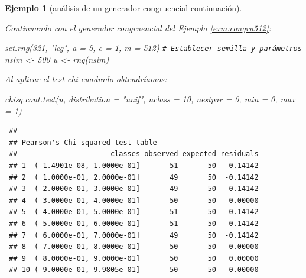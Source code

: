 \documentclass[
  10pt,
]{book}
\newenvironment{Shaded}{\begin{snugshade}}{\end{snugshade}}
\newcommand{\AttributeTok}[1]{\textcolor[rgb]{0.77,0.63,0.00}{#1}}
\newcommand{\CommentTok}[1]{\textcolor[rgb]{0.56,0.35,0.01}{\textit{#1}}}
\newcommand{\DecValTok}[1]{\textcolor[rgb]{0.00,0.00,0.81}{#1}}
\newcommand{\FunctionTok}[1]{\textcolor[rgb]{0.00,0.00,0.00}{#1}}
\newcommand{\NormalTok}[1]{#1}
\newcommand{\OtherTok}[1]{\textcolor[rgb]{0.56,0.35,0.01}{#1}}
\newcommand{\StringTok}[1]{\textcolor[rgb]{0.31,0.60,0.02}{#1}}
\theoremstyle{break}
\newtheorem{example}{Ejemplo}[chapter]
\theoremstyle{nonumberplain}
\renewcommand{\CommentTok}[1]{\textcolor[rgb]{0.41,0.41,0.41}{\texttt{#1}}}
\begin{document}
\begin{example}[análisis de un generador congruencial continuación]
\protect\hypertarget{exm:congru512b}{}\label{exm:congru512b}

Continuando con el generador congruencial del Ejemplo \ref{exm:congru512}:

\begin{Shaded}
\begin{Highlighting}[]
\FunctionTok{set.rng}\NormalTok{(}\DecValTok{321}\NormalTok{, }\StringTok{"lcg"}\NormalTok{, }\AttributeTok{a =} \DecValTok{5}\NormalTok{, }\AttributeTok{c =} \DecValTok{1}\NormalTok{, }\AttributeTok{m =} \DecValTok{512}\NormalTok{)  }\CommentTok{\# Establecer semilla y parámetros}
\NormalTok{nsim }\OtherTok{\textless{}{-}} \DecValTok{500}
\NormalTok{u }\OtherTok{\textless{}{-}} \FunctionTok{rng}\NormalTok{(nsim)}
\end{Highlighting}
\end{Shaded}

Al aplicar el test chi-cuadrado obtendríamos:



\begin{Shaded}
\begin{Highlighting}[]
\FunctionTok{chisq.cont.test}\NormalTok{(u, }\AttributeTok{distribution =} \StringTok{"unif"}\NormalTok{, }
                \AttributeTok{nclass =} \DecValTok{10}\NormalTok{, }\AttributeTok{nestpar =} \DecValTok{0}\NormalTok{, }\AttributeTok{min =} \DecValTok{0}\NormalTok{, }\AttributeTok{max =} \DecValTok{1}\NormalTok{)}
\end{Highlighting}
\end{Shaded}

\begin{verbatim}
 ## 
 ## Pearson's Chi-squared test table
 ##                      classes observed expected residuals
 ## 1  (-1.4901e-08, 1.0000e-01]       51       50   0.14142
 ## 2  ( 1.0000e-01, 2.0000e-01]       49       50  -0.14142
 ## 3  ( 2.0000e-01, 3.0000e-01]       49       50  -0.14142
 ## 4  ( 3.0000e-01, 4.0000e-01]       50       50   0.00000
 ## 5  ( 4.0000e-01, 5.0000e-01]       51       50   0.14142
 ## 6  ( 5.0000e-01, 6.0000e-01]       51       50   0.14142
 ## 7  ( 6.0000e-01, 7.0000e-01]       49       50  -0.14142
 ## 8  ( 7.0000e-01, 8.0000e-01]       50       50   0.00000
 ## 9  ( 8.0000e-01, 9.0000e-01]       50       50   0.00000
 ## 10 ( 9.0000e-01, 9.9805e-01]       50       50   0.00000
\end{verbatim}


\end{example}
\end{document}

